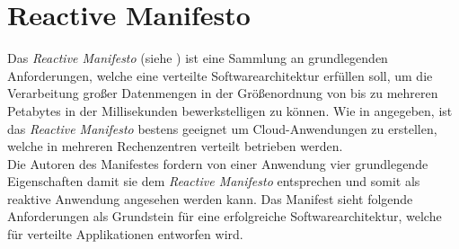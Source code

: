 \section{Reactive Manifesto}
\label{reactiveManifesto}
Das \textit{Reactive Manifesto} (siehe \cite{reactiveManifesto}) ist eine Sammlung an grundlegenden Anforderungen, welche eine verteilte Softwarearchitektur erfüllen soll, um die Verarbeitung großer Datenmengen in der Größenordnung von bis zu mehreren Petabytes in der Millisekunden bewerkstelligen zu können. 
Wie in \cite{reactiveManifesto} angegeben, ist das \textit{Reactive Manifesto} bestens geeignet um Cloud-Anwendungen zu erstellen, welche in mehreren Rechenzentren verteilt betrieben werden. \\
Die Autoren des Manifestes fordern von einer Anwendung vier grundlegende Eigenschaften damit sie dem \textit{Reactive Manifesto} entsprechen und somit als reaktive Anwendung angesehen werden kann. Das Manifest sieht folgende Anforderungen als Grundstein für eine erfolgreiche Softwarearchitektur, welche für verteilte Applikationen entworfen wird. 
